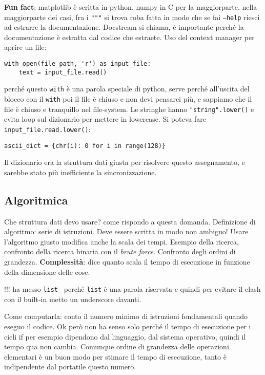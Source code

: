 \documentclass[10pt, a4paper, titlepage]{book}
\begin{document}
\textbf{Fun fact}: matplotlib è scritta in python, numpy in C per la maggiorparte.
nella maggiorparte dei casi, fra i \texttt{"""} si trova roba fatta in modo che se fai \texttt{--help} riesci ad estrarre la documentazione.
Docstream si chiama, è importante perché la documentazione è estratta dal codice che estraete.
Uso del context manager per aprire un file:

\begin{verbatim}
with open(file_path, 'r') as input_file:
	text = input_file.read()	
\end{verbatim}

perché questo \texttt{with} è una parola speciale di python, serve perché all'uscita del blocco con il \texttt{with} poi il file è chiuso e non devi pensarci più, e sappiamo che il file è chiuso e tranquillo nel file-system.
Le stringhe hanno \texttt{"string".lower()} e evita loop sul dizionario per mettere in lowercase.
Si poteva fare \texttt{input_file.read.lower()}:
\begin{verbatim}
ascii_dict = {chr(i): 0 for i in range(128)}
\end{verbatim}

Il dizionario era la struttura dati giusta per risolvere questo assegnamento, e sarebbe stato più inefficiente la sincronizzazione.

\subsection{Algoritmica}

Che struttura dati devo usare? come rispondo a questa domanda.
Definizione di algoritmo: serie di istruzioni. Deve essere scritta in modo non ambiguo! Usare l'algoritmo giusto modifica anche la scala dei tempi.
Esempio della ricerca, confronto della ricerca binaria con il \textit{brute force}.
Confronto degli ordini di grandezza.
\textbf{Complessità}: dice quanto scala il tempo di esecuzione in funzione della dimensione delle cose.

!!! ha messo \texttt{list\_} perché \texttt{list} è una parola riservata e quindi per evitare il clash con il built-in metto un underscore davanti.

Come computarla: conto il numero minimo di istruzioni fondamentali quando eseguo il codice.
Ok però non ha senso solo perché il tempo di esecuzione per i cicli if per esempio dipendono dal linguaggio, dal sistema operativo, quindi il tempo qua non cambia. Comunque ordine di grandezza delle operazioni elementari è un buon modo per stimare il tempo di esecuzione, tanto è indipendente dal portatile questo numero.
\end{document}
